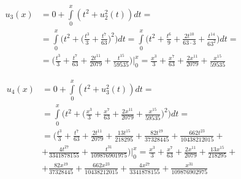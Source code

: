 \begin{equation}\label{eq:09}
    \begin{split}
        u_3(x) &= 0 + \int\limits_0^x(t^2 + u_2^2(t))dt = \\ &=
        \int\limits_0^x\bigg(t^2 + \bigg(\frac{t^3}{3} +
        \frac{t^7}{63}\bigg)^2\bigg) dt = \int\limits_0^x\bigg(t^2 +
        \frac{t^6}{9} + \frac{2t^{10}}{63 \cdot 3} + \frac{t^{14}}{63^2}\bigg) dt =
        \\ &= \bigg(\frac{t^3}{3} + \frac{t^7}{63} + \frac{2t^{11}}{2079} +
        \frac{t^{15}}{59535}\bigg)\bigg|_0^x = \frac{x^3}{3} + \frac{x^7}{63} +
        \frac{2x^{11}}{2079} + \frac{x^{15}}{59535}
    \end{split}
\end{equation}

\begin{equation}\label{eq:10}
    \begin{split}
        u_4(x) &= 0 + \int\limits_0^x(t^2 + u_3^2(t))dt = \\ &=
        \int\limits_0^x\bigg(t^2 + \bigg(\frac{x^3}{3} + \frac{x^7}{63} +
        \frac{2x^{11}}{2079} + \frac{x^{15}}{59535}\bigg)^2\bigg) dt = \\ &=
        \bigg(\frac{t^3}{3} + \frac{t^7}{63} + \frac{2t^{11}}{2079} +
        \frac{13t^{15}}{218295} +  \frac{82t^{19}}{37328445} +
        \frac{662t^{23}}{10438212015} + \\ & + \frac{4t^{27}}{3341878155} +
        \frac{t^{31}}{109876901975}\bigg)\bigg|_0^x =
        \frac{x^3}{3} + \frac{x^7}{63} + \frac{2x^{11}}{2079} +
        \frac{13x^{15}}{218295} + \\ &+ \frac{82x^{19}}{37328445} +
        \frac{662x^{23}}{10438212015} + \frac{4x^{27}}{3341878155} +
        \frac{x^{31}}{109876902975}
    \end{split}
\end{equation}



